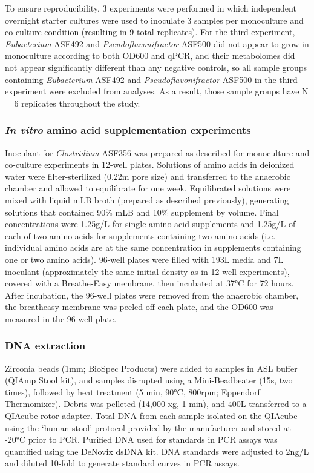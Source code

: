 \documentclass[11pt,onecolumn,notitlepage,openany,twoside]{book}
\begin{document}
\begin{refsection}
To ensure reproducibility, 3 experiments were performed in which independent overnight starter cultures were used to inoculate 3 samples per monoculture and co-culture condition (resulting in 9 total replicates). For the third experiment, \textit{Eubacterium} ASF492 and \textit{Pseudoflavonifractor} ASF500 did not appear to grow in monoculture according to both OD600 and qPCR, and their metabolomes did not appear significantly different than any negative controls, so all sample groups containing \textit{Eubacterium} ASF492 and \textit{Pseudoflavonifractor} ASF500 in the third experiment were excluded from analyses. As a result, those sample groups have N = 6 replicates throughout the study.

\subsubsection{\textit{In vitro} amino acid supplementation experiments}

Inoculant for \textit{Clostridium} ASF356 was prepared as described for monoculture and co-culture experiments in 12-well plates. Solutions of amino acids in deionized water were filter-sterilized (0.22{\textmu}m pore size) and transferred to the anaerobic chamber and allowed to equilibrate for one week. Equilibrated solutions were mixed with liquid mLB broth (prepared as described previously), generating solutions that contained 90\% mLB and 10\% supplement by volume. Final concentrations were 1.25g/L for single amino acid supplements and 1.25g/L of each of two amino acids for supplements containing two amino acids (i.e. individual amino acids are at the same concentration in supplements containing one or two amino acids). 96-well plates were filled with 193{\textmu}L media and 7{\textmu}L inoculant (approximately the same initial density as in 12-well experiments), covered with a Breathe-Easy membrane, then incubated at 37°C for 72 hours. After incubation, the 96-well plates were removed from the anaerobic chamber, the breatheasy membrane was peeled off each plate, and the OD600 was measured in the 96 well plate.

\subsubsection{DNA extraction}

Zirconia beads (1mm; BioSpec Products) were added to samples in ASL buffer (QIAmp Stool kit), and samples disrupted using a Mini-Beadbeater (15s, two times), followed by heat treatment (5 min, 90°C, 800rpm; Eppendorf Thermomixer). Debris was pelleted (14,000 xg, 1 min), and 400{\textmu}L transferred to a QIAcube rotor adapter. Total DNA from each sample isolated on the QIAcube using the ‘human stool’ protocol provided by the manufacturer and stored at -20°C prior to PCR. Purified DNA used for standards in PCR assays was quantified using the DeNovix dsDNA kit. DNA standards were adjusted to 2ng/{\textmu}L and diluted 10-fold to generate standard curves in PCR assays.


\end{refsection}
\end{document}
